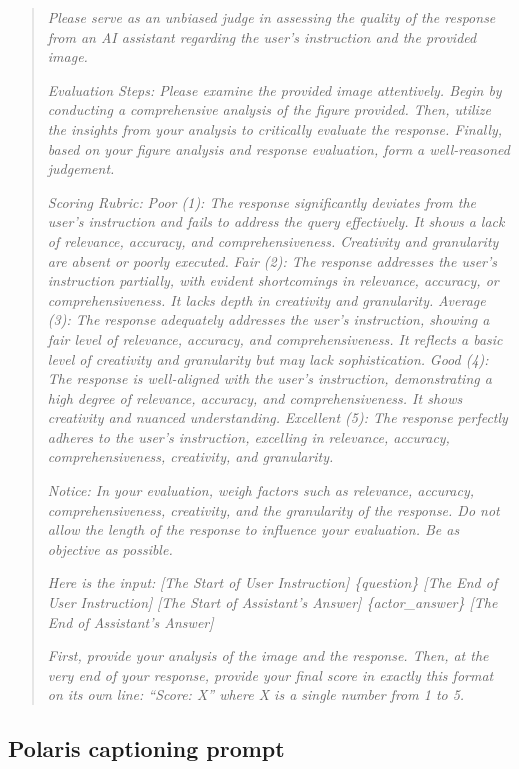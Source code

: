 \documentclass{article}
\begin{document}
\begin{quote}
\small
\textit{Please serve as an unbiased judge in assessing the quality of the response from an AI assistant regarding the user's instruction and the provided image.}

\textit{Evaluation Steps: Please examine the provided image attentively. Begin by conducting a comprehensive analysis of the figure provided. Then, utilize the insights from your analysis to critically evaluate the response. Finally, based on your figure analysis and response evaluation, form a well-reasoned judgement.}

\textit{Scoring Rubric:}
\textit{Poor (1): The response significantly deviates from the user's instruction and fails to address the query effectively. It shows a lack of relevance, accuracy, and comprehensiveness. Creativity and granularity are absent or poorly executed.}
\textit{Fair (2): The response addresses the user's instruction partially, with evident shortcomings in relevance, accuracy, or comprehensiveness. It lacks depth in creativity and granularity.}
\textit{Average (3): The response adequately addresses the user's instruction, showing a fair level of relevance, accuracy, and comprehensiveness. It reflects a basic level of creativity and granularity but may lack sophistication.}
\textit{Good (4): The response is well-aligned with the user's instruction, demonstrating a high degree of relevance, accuracy, and comprehensiveness. It shows creativity and nuanced understanding.}
\textit{Excellent (5): The response perfectly adheres to the user's instruction, excelling in relevance, accuracy, comprehensiveness, creativity, and granularity.}

\textit{Notice: In your evaluation, weigh factors such as relevance, accuracy, comprehensiveness, creativity, and the granularity of the response. Do not allow the length of the response to influence your evaluation. Be as objective as possible.}

\textit{Here is the input:}
\textit{[The Start of User Instruction] \{question\} [The End of User Instruction]}
\textit{[The Start of Assistant's Answer] \{actor\_answer\} [The End of Assistant's Answer]}

\textit{First, provide your analysis of the image and the response. Then, at the very end of your response, provide your final score in exactly this format on its own line: ``Score: X'' where X is a single number from 1 to 5.}
\end{quote}

\subsection{Polaris captioning prompt}
\end{document}
